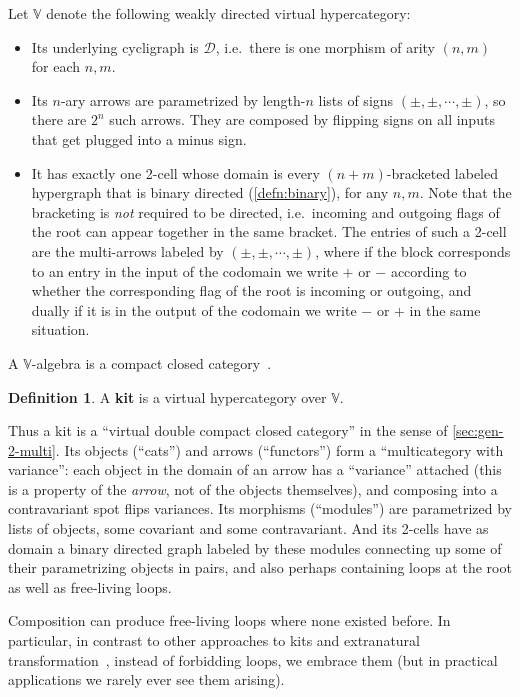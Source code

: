 \documentclass{article}
\theoremstyle{definition}
\newtheorem{defn}[thm]{Definition}
\theoremstyle{remark}
\def\dhy{\mathcal{D}}
\def\vhy{\mathbb{V}}
\begin{document}
Let $\vhy$ denote the following weakly directed virtual hypercategory:
\begin{itemize}
\item Its underlying cycligraph is $\dhy$, i.e.\ there is one morphism of arity $(n,m)$ for each $n,m$.
\item Its $n$-ary arrows are parametrized by length-$n$ lists of signs $(\pm,\pm,\cdots,\pm)$, so there are $2^n$ such arrows.
  They are composed by flipping signs on all inputs that get plugged into a minus sign.
\item It has exactly one 2-cell whose domain is every $(n+m)$-bracketed labeled hypergraph that is binary directed (\cref{defn:binary}), for any $n,m$.
  Note that the bracketing is \emph{not} required to be directed, i.e.\ incoming and outgoing flags of the root can appear together in the same bracket.
  The entries of such a 2-cell are the multi-arrows labeled by $(\pm,\pm,\cdots,\pm)$, where if the block corresponds to an entry in the input of the codomain we write $+$ or $-$ according to whether the corresponding flag of the root is incoming or outgoing, and dually if it is in the output of the codomain we write $-$ or $+$ in the same situation.
\end{itemize}

A $\vhy$-algebra is a compact closed category~\cite{kl:cpt}.

\begin{defn}
  A \textbf{kit} is a virtual hypercategory over $\vhy$.
\end{defn}

Thus a kit is a  ``virtual double compact closed category'' in the sense of \cref{sec:gen-2-multi}.
Its objects (``cats'') and arrows (``functors'') form a ``multicategory with variance'': each object in the domain of an arrow has a ``variance'' attached (this is a property of the \emph{arrow}, not of the objects themselves), and composing into a contravariant spot flips variances.
Its morphisms (``modules'') are parametrized by lists of objects, some covariant and some contravariant.
And its 2-cells have as domain a binary directed graph labeled by these modules connecting up some of their parametrizing objects in pairs, and also perhaps containing loops at the root as well as free-living loops.

Composition can produce free-living loops where none existed before.
In particular, in contrast to other approaches to kits and extranatural transformation~\cite{ek:gen-funct-calc}, instead of forbidding loops, we embrace them (but in practical applications we rarely ever see them arising).
\end{document}
